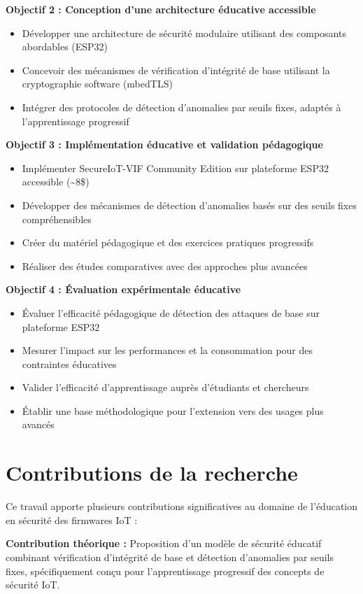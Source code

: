 \textbf{Objectif 2 : Conception d'une architecture éducative accessible}
\begin{itemize}
    \item Développer une architecture de sécurité modulaire utilisant des composants abordables (ESP32)
    \item Concevoir des mécanismes de vérification d'intégrité de base utilisant la cryptographie software (mbedTLS)
    \item Intégrer des protocoles de détection d'anomalies par seuils fixes, adaptés à l'apprentissage progressif
\end{itemize}

\textbf{Objectif 3 : Implémentation éducative et validation pédagogique}
\begin{itemize}
    \item Implémenter SecureIoT-VIF Community Edition sur plateforme ESP32 accessible (\textasciitilde 8\$)
    \item Développer des mécanismes de détection d'anomalies basés sur des seuils fixes compréhensibles
    \item Créer du matériel pédagogique et des exercices pratiques progressifs
    \item Réaliser des études comparatives avec des approches plus avancées
\end{itemize}

\textbf{Objectif 4 : Évaluation expérimentale éducative}
\begin{itemize}
    \item Évaluer l'efficacité pédagogique de détection des attaques de base sur plateforme ESP32
    \item Mesurer l'impact sur les performances et la consommation pour des contraintes éducatives
    \item Valider l'efficacité d'apprentissage auprès d'étudiants et chercheurs
    \item Établir une base méthodologique pour l'extension vers des usages plus avancés
\end{itemize}

\section{Contributions de la recherche}

Ce travail apporte plusieurs contributions significatives au domaine de l'éducation en sécurité des firmwares IoT :

\textbf{Contribution théorique :} Proposition d'un modèle de sécurité éducatif combinant vérification d'intégrité de base et détection d'anomalies par seuils fixes, spécifiquement conçu pour l'apprentissage progressif des concepts de sécurité IoT.

